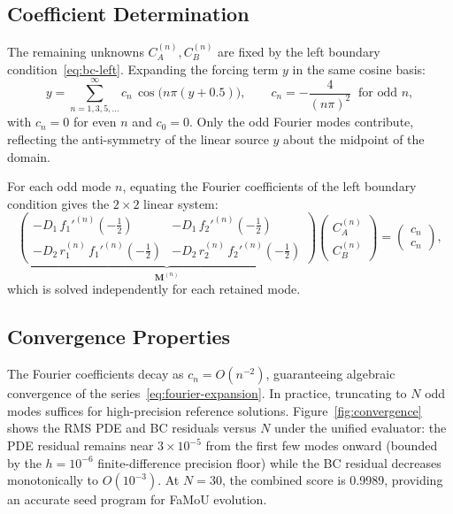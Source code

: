 \subsection{Coefficient Determination}
\label{sec:coefficient-determination}

The remaining unknowns $C_A^{(n)}, C_B^{(n)}$ are fixed by the left boundary condition~\eqref{eq:bc-left}. Expanding the forcing term $y$ in the same cosine basis:
\begin{equation}
  y = \sum_{n=1,3,5,\ldots}^{\infty}
  c_n\,\cos\!\bigl(n\pi(y+0.5)\bigr),
  \qquad
  c_n = -\frac{4}{(n\pi)^2} \;\;\text{for odd } n,
  \label{eq:fourier-coeff}
\end{equation}
with $c_n = 0$ for even $n$ and $c_0 = 0$. Only the odd Fourier modes contribute, reflecting the anti-symmetry of the linear source $y$ about the midpoint of the domain.

For each odd mode $n$, equating the Fourier coefficients of the left boundary condition gives the $2\times 2$ linear system:
\begin{equation}
  \underbrace{
  \begin{pmatrix}
    -D_1\,f_1'^{(n)}(-\tfrac12) & -D_1\,f_2'^{(n)}(-\tfrac12) \\[4pt]
    -D_2\,r_1^{(n)}\,f_1'^{(n)}(-\tfrac12)
      & -D_2\,r_2^{(n)}\,f_2'^{(n)}(-\tfrac12)
  \end{pmatrix}
  }_{\mathbf{M}^{(n)}}
  \begin{pmatrix} C_A^{(n)} \\ C_B^{(n)} \end{pmatrix}
  =
  \begin{pmatrix} c_n \\ c_n \end{pmatrix},
  \label{eq:coefficient-system}
\end{equation}
which is solved independently for each retained mode.

\subsection{Convergence Properties}
\label{sec:convergence}

The Fourier coefficients decay as $c_n = O(n^{-2})$, guaranteeing algebraic convergence of the series~\eqref{eq:fourier-expansion}. In practice, truncating to $N$ odd modes suffices for high-precision reference solutions. Figure~\ref{fig:convergence} shows the RMS PDE and BC residuals versus $N$ under the unified evaluator: the PDE residual remains near $3 \times 10^{-5}$ from the first few modes onward (bounded by the $h = 10^{-6}$ finite-difference precision floor) while the BC residual decreases monotonically to $O(10^{-3})$. At $N{=}30$, the combined score is 0.9989, providing an accurate seed program for FaMoU evolution.

